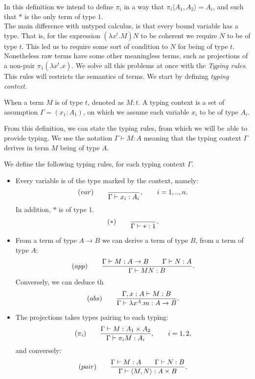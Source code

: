 In this definition we intend to define $\pi_i$ in a way that $\pi_i \langle A_1,A_2\rangle = A_i$, and such that $*$ is the only term of type $1$.\\

The main difference with untyped calculus, is that every bound variable has a type. That is, for the expression $(\lambda x^t.M)N$ to be coherent we require $N$ to be of type $t$. This led us to require some sort of condition to $N$ for being of type $t$.\\

Nonetheless raw terms have some other meaningless terms, such as projections of a non-pair $\pi_1(\lambda x^t.x)$. We solve all this problems at once with the \emph {Typing rules}. This rules will restricts the semantics of terms. We start by defining \emph{typing context}.

\begin{definition}
  When a term $M$ is of type $t$, denoted as $M:t$. A typing context is a set of assumption $\Gamma = (x_1:A_1)$, on which we assume each variable $x_i$ to be of type $A_i$.
\end{definition}

From this definition, we can state the typing rules, from which we will be able to provide typing. We use the notation $\Gamma \vdash M:A$ meaning that the typing context $\Gamma$ derives in term $M$ being of type $A$. 



\begin{definition}\label{def:typing-rules}
  We define the following typing rules, for each typing context $\Gamma$.
  \begin{itemize}
    \item Every variable is of the type marked by the context, namely:
$$  (var)\qquad  {\displaystyle \over \Gamma \vdash x_i:A_i},\qquad  i=  1,..,n.$$
In addition,  $*$ is of type 1.
    $$  (*)\qquad  {\displaystyle \over \Gamma\vdash *:1}.$$

\item From a term of type $A\to B$ we can derive a term of type $B$, from a term of type $A$:
  $$(app)\qquad  {\displaystyle \Gamma \vdash M:A\to B\qquad \Gamma \vdash N:A      \over \Gamma \vdash MN:B}.$$
  Conversely, we can deduce th
  $$(abs)\qquad  {\displaystyle \Gamma, x: A\vdash M: B  \over \Gamma \vdash \lambda x^A.m:A\to B}.$$
\item The projections takes types pairing to each typing:
  $$(\pi_i) \qquad {\displaystyle \Gamma\vdash M: A_1\times A_2 \over \Gamma \vdash \pi_i M: A_i},\qquad i=1,2,$$
and conversely:
    $$(pair) \qquad {\displaystyle \Gamma\vdash M: A\qquad \Gamma\vdash N: B \over \Gamma \vdash \langle M, N\rangle:  A\times B}.$$
  \end{itemize}
\end{definition}



